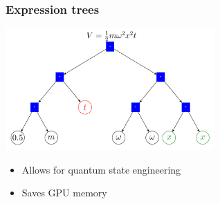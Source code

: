 \documentclass{beamer}
\begin{document}
\begin{frame}
\frametitle{Expression trees}

\center \includegraphics[width=0.6\textwidth]{expr_tree.png}

\begin{itemize}
\item Allows for quantum state engineering
\item Saves GPU memory
\end{itemize}
\end{frame}
\end{document}
